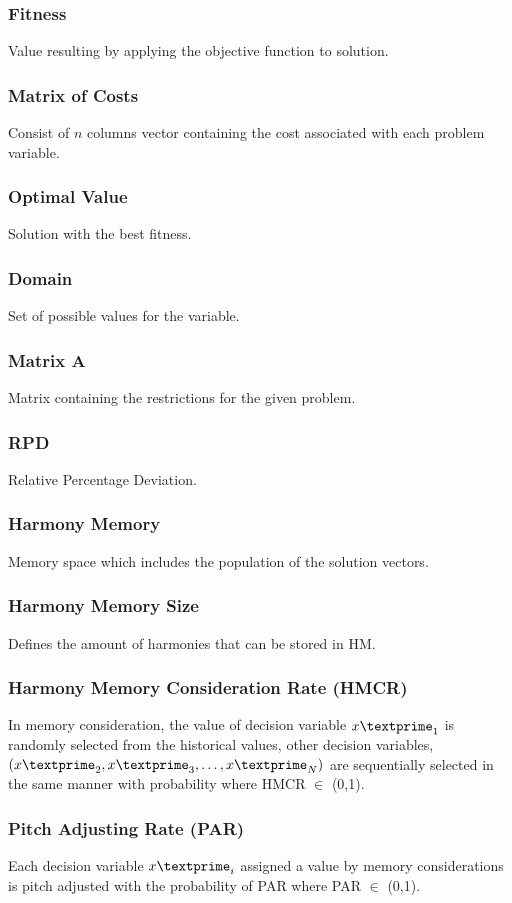 \subsubsection{Fitness} 
Value resulting by applying the objective function to solution.

\subsubsection{Matrix of Costs} 
Consist of $n$ columns vector containing the cost associated with each problem variable.

\subsubsection{Optimal Value} 
Solution with the best fitness.

\subsubsection{Domain} 
Set of possible values for the variable.

\subsubsection{Matrix A} 
Matrix containing the restrictions for the given problem.

\subsubsection{RPD} 
Relative Percentage Deviation.

\subsubsection{Harmony Memory} 
Memory space which includes the population of the solution vectors.

\subsubsection{Harmony Memory Size} 
Defines the amount of harmonies that can be stored in HM.

\subsubsection{Harmony Memory Consideration Rate (HMCR)} 
In memory consideration, the value of decision variable ${x\textprime}_1$ is randomly selected from the historical values, other decision variables, $({x\textprime}_2, {x\textprime}_3,\dots,{x\textprime}_N)$ are sequentially selected in the same manner with probability where HMCR $\in$ (0,1).

\subsubsection{Pitch Adjusting Rate (PAR)} 
Each decision variable ${x\textprime}_i$ assigned a value by memory considerations is pitch adjusted with the probability of PAR where PAR $\in$ (0,1).




